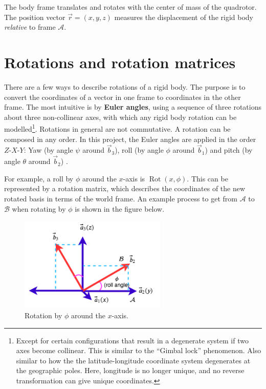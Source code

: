 \documentclass[a4paper]{report}
\DeclareMathOperator{\Rot}{Rot}
\begin{document}
The body frame translates and rotates with the center of mass of the quadrotor. 
The position vector $\vec{r}=(x, y,z)$ measures the displacement of the rigid body \textit{relative} to frame $\mathcal{A}$. 

\section{Rotations and rotation matrices}
There are a few ways to describe rotations of a rigid body.
The purpose is to convert the coordinates of a vector in one frame to coordinates in the other frame. 
The most intuitive is by \textbf{Euler angles}, using a sequence of three rotations about three non-collinear axes, with which any rigid body rotation can be modelled\footnote{
Except for certain configurations that result in a degenerate system if two axes become collinear.
This is similar to the ``Gimbal lock'' phenomenon. 
Also similar to how the the latitude-longitude coordinate system degenerates at the geographic poles.
Here, longitude is no longer unique, and no reverse transformation can give unique coordinates.
}.
Rotations in general are not commutative.
A rotation can be composed in any order. In this project, the Euler angles are applied in the order $Z$-$X$-$Y$: 
Yaw (by angle $\psi$ around $\vec{b}_3$),
roll (by angle $\phi$ around $\vec{b}_1$) and
pitch (by angle $\theta$ around $\vec{b}_2$) \cite[p. 313]{Powers2015}.

For example, a roll by $\phi$ around the $x$-axis is $\Rot(x, \phi)$. This can be represented by a rotation matrix, which describes the coordinates of the new rotated basis in terms of the world frame. An example process to get from $\mathcal{A}$ to $\mathcal{B}$ when rotating by $\phi$ is shown in the figure below.

\begin{figure}[H]
\centering
\includegraphics[width=7cm]{img/rotations.png}
\caption{Rotation by $\phi$ around the $x$-axis.\label{fig:rotations}}
\end{figure}
\end{document}
